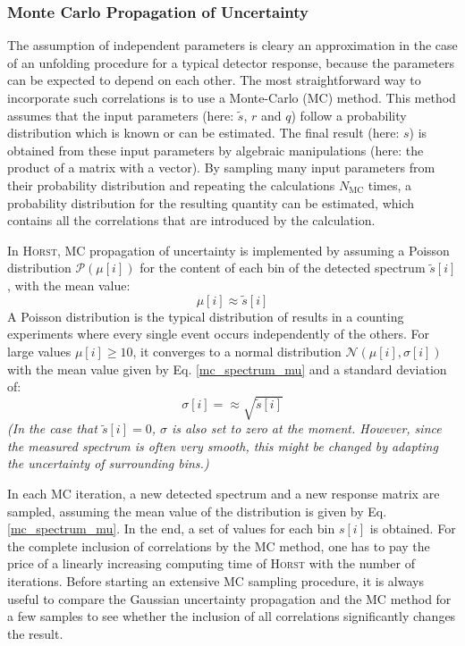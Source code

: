 \documentclass{article}
\begin{document}
\subsubsection{Monte Carlo Propagation of Uncertainty}

The assumption of independent parameters is cleary an approximation in the case of an unfolding procedure for a typical detector response, because the parameters can be expected to depend on each other.
The most straightforward way to incorporate such correlations is to use a Monte-Carlo (MC) method.
This method assumes that the input parameters (here: $\tilde{s}$, $r$ and $q$) follow a probability distribution which is known or can be estimated.
The final result (here: $s$) is obtained from these input parameters by algebraic manipulations (here: the product of a matrix with a vector).
By sampling many input parameters from their probability distribution and repeating the calculations $N_\mathrm{MC}$ times, a probability distribution for the resulting quantity can be estimated, which contains all the correlations that are introduced by the calculation.

\noindent In \textsc{Horst}, MC propagation of uncertainty is implemented by assuming a Poisson distribution $\mathcal{P}(\mu[i])$ for the content of each bin of the detected spectrum $\tilde{s}[i]$, with the mean value:
%
\begin{equation}
	\label{mc_spectrum_mu}
	\mu [i] \approx \tilde{s}[i]
\end{equation}
%
A Poisson distribution is the typical distribution of results in a counting experiments where every single event occurs independently of the others.
For large values $\mu[i] \geq 10$, it converges to a normal distribution $\mathcal{N}(\mu[i], \sigma[i])$ with the mean value given by Eq. \ref{mc_spectrum_mu} and a standard deviation of:
%
\begin{equation}
	\label{mc_spectrum_sigma}
	\sigma[i] = \approx \sqrt{\tilde{s}[i]}
\end{equation}
%
\textit{(In the case that $\tilde {s} [i] = 0$, $\sigma$ is also set to zero at the moment. However, since the measured spectrum is often very smooth, this might be changed by adapting the uncertainty of surrounding bins.)}

\noindent In each MC iteration, a new detected spectrum and a new response matrix are sampled, assuming the mean value of the distribution is given by Eq. \ref{mc_spectrum_mu}.
In the end, a set of values for each bin $s[i]$ is obtained.
For the complete inclusion of correlations by the MC method, one has to pay the price of a linearly increasing computing time of \textsc{Horst} with the number of iterations.
Before starting an extensive MC sampling procedure, it is always useful to compare the Gaussian uncertainty propagation and the MC method for a few samples to see whether the inclusion of all correlations significantly changes the result.
\end{document}
